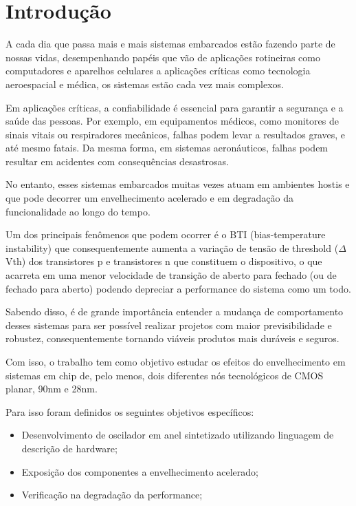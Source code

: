 	\chapter{Introdução}

A cada dia que passa mais e mais sistemas embarcados estão fazendo parte de nossas vidas, desempenhando papéis que vão de aplicações rotineiras como computadores e aparelhos celulares a aplicações críticas como tecnologia aeroespacial e médica, os sistemas estão cada vez mais complexos.

Em aplicações críticas, a confiabilidade é essencial para garantir a segurança e a saúde das pessoas. Por exemplo, em equipamentos médicos, como monitores de sinais vitais ou respiradores mecânicos, falhas podem levar a resultados graves, e até mesmo fatais. Da mesma forma, em sistemas aeronáuticos, falhas podem resultar em acidentes com consequências desastrosas.

No entanto, esses sistemas embarcados muitas vezes atuam em ambientes hostis e que pode decorrer um envelhecimento acelerado e em degradação da funcionalidade ao longo do tempo.

Um dos principais fenômenos que podem ocorrer é o BTI (bias-temperature instability) que consequentemente aumenta a variação de tensão de threshold ($\Delta$Vth) dos transistores p e transistores n que constituem o dispositivo, o que acarreta em uma menor velocidade de transição de aberto para fechado (ou de fechado para aberto) podendo depreciar a performance do sistema como um todo.

Sabendo disso, é de grande importância entender a mudança de comportamento desses sistemas para ser possível realizar projetos com maior previsibilidade e robustez, consequentemente tornando viáveis produtos mais duráveis e seguros.

Com isso, o trabalho tem como objetivo estudar os efeitos do envelhecimento em sistemas em chip de, pelo menos, dois diferentes nós tecnológicos de CMOS planar, 90nm e 28nm.

Para isso foram definidos os seguintes objetivos específicos:
\begin{itemize}
    \item Desenvolvimento de oscilador em anel sintetizado utilizando linguagem de descrição de hardware;
    \item Exposição dos componentes a envelhecimento acelerado;
    \item Verificação na degradação da performance;
\end{itemize}

